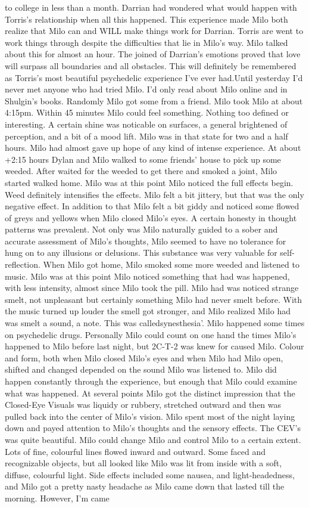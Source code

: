 \documentclass[12pt]{book}
\begin{document}
to college in less than a month. Darrian had wondered what would happen with Torris's relationship when all this happened. This experience made Milo both realize that Milo can and WILL make things work for Darrian. Torris are went to work things through despite the difficulties that lie in Milo's way. Milo talked about this for almost an hour. The joined of Darrian's emotions proved that love will surpass all boundaries and all obstacles. This will definitely be remembered as Torris's most beautiful psychedelic experience I've ever had.Until yesterday I'd never met anyone who had tried Milo. I'd only read about Milo online and in Shulgin's books. Randomly Milo got some from a friend. Milo took Milo at about 4:15pm. Within 45 minutes Milo could feel something. Nothing too defined or interesting. A certain shine was noticable on surfaces, a general brightened of perception, and a bit of a mood lift. Milo was in that state for two and a half hours. Milo had almost gave up hope of any kind of intense experience. At about +2:15 hours Dylan and Milo walked to some friends' house to pick up some weeded. After waited for the weeded to get there and smoked a joint, Milo started walked home. Milo was at this point Milo noticed the full effects begin. Weed definitely intensifies the effects. Milo felt a bit jittery, but that was the only negative effect. In addition to that Milo felt a bit giddy and noticed some flowed of greys and yellows when Milo closed Milo's eyes. A certain honesty in thought patterns was prevalent. Not only was Milo naturally guided to a sober and accurate assessment of Milo's thoughts, Milo seemed to have no tolerance for hung on to any illusions or delusions. This substance was very valuable for self-reflection. When Milo got home, Milo smoked some more weeded and listened to music. Milo was at this point Milo noticed something that had was happened, with less intensity, almost since Milo took the pill. Milo had was noticed strange smelt, not unpleasant but certainly something Milo had never smelt before. With the music turned up louder the smell got stronger, and Milo realized Milo had was smelt a sound, a note. This was calledsynesthesia'. Milo happened some times on psychedelic drugs. Personally Milo could count on one hand the times Milo's happened to Milo before last night, but 2C-T-2 was knew for caused Milo. Colour and form, both when Milo closed Milo's eyes and when Milo had Milo open, shifted and changed depended on the sound Milo was listened to. Milo did happen constantly through the experience, but enough that Milo could examine what was happened. At several points Milo got the distinct impression that the Closed-Eye Visuals was liquidy or rubbery, stretched outward and then was pulled back into the center of Milo's vision. Milo spent most of the night laying down and payed attention to Milo's thoughts and the sensory effects. The CEV's was quite beautiful. Milo could change Milo and control Milo to a certain extent. Lots of fine, colourful lines flowed inward and outward. Some faced and recognizable objects, but all looked like Milo was lit from inside with a soft, diffuse, colourful light. Side effects included some nausea, and light-headedness, and Milo got a pretty nasty headache as Milo came down that lasted till the morning. However, I'm came 
\end{document}
